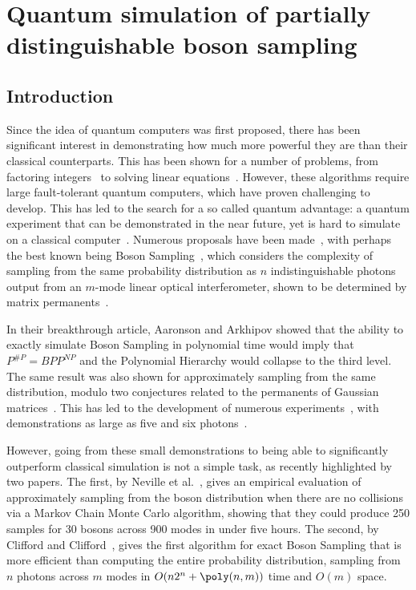 \chapter{Quantum simulation of partially distinguishable boson sampling}
\label{chp:noisy_circuit}

\section{Introduction}
\label{sec:intro}

Since the idea of quantum computers was first proposed, there has been significant interest in demonstrating how much more powerful they are than their classical counterparts. 
This has been shown for a number of problems, from factoring integers~\cite{shor1997} to solving linear equations~\cite{harrow2009}. 
However, these algorithms require large fault-tolerant quantum computers, which have proven challenging to develop. 
This has led to the search for a so called quantum advantage: a quantum experiment that can be demonstrated in the near future, yet is hard to simulate on a classical computer~\cite{harrow2017}. 
Numerous proposals have been made~\cite{bremner2016, boixo2016}, with perhaps the best known being Boson Sampling~\cite{aaronson2011}, which considers the complexity of sampling from the same probability distribution as $n$ indistinguishable photons output from an $m$-mode linear optical interferometer, shown to be determined by matrix permanents~\cite{scheel2008}.

In their breakthrough article, Aaronson and Arkhipov showed that the ability to exactly simulate Boson Sampling in polynomial time would imply that $P^{\#P} = BPP^{NP}$ and the Polynomial Hierarchy would collapse to the third level. 
The same result was also shown for approximately sampling from the same distribution, modulo two conjectures related to the permanents of Gaussian matrices~\cite{aaronson2011}. 
This has led to the development of numerous experiments~\cite{broome2013, spring2013, tillmann2013, crespi2013}, with demonstrations as large as five and six photons~\cite{carolan2015, wang2017}.

However, going from these small demonstrations to being able to significantly outperform classical simulation is not a simple task, as recently highlighted by two papers. 
The first, by Neville et al.~\cite{neville2017}, gives an empirical evaluation of approximately sampling from the boson distribution when there are no collisions via a Markov Chain Monte Carlo algorithm, showing that they could produce 250 samples for 30 bosons across 900 modes in under five hours. 
The second, by Clifford and Clifford~\cite{clifford2017}, gives the first algorithm for exact Boson Sampling that is more efficient than computing the entire probability distribution, sampling from $n$ photons across $m$ modes in $O(n2^n + \poly(n,m))$ time and $O(m)$ space.

